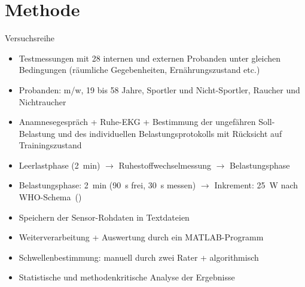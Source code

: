 \documentclass[colorBG,slideColor,8pt]{beamer}
\begin{document}
\section{Methode}

\begin{frame}{Versuchsreihe}
\begin{itemize}
	\item Testmessungen mit 28 internen und externen Probanden unter gleichen Bedingungen (räumliche Gegebenheiten, Ernährungszustand etc.)
	\item Probanden: m/w, 19 bis 58 Jahre, Sportler und Nicht-Sportler, Raucher und Nichtraucher
	\item Anamnesegespräch + Ruhe-EKG + Bestimmung der ungefähren Soll-Belastung und des individuellen Belastungsprotokolls mit Rücksicht auf Trainingszustand
	\item Leerlastphase (\SI{2}{\minute}) $\rightarrow$ Ruhestoffwechselmessung $\rightarrow$ Belastungsphase
	\item Belastungsphase: \SI{2}{\minute} (\SI{90}{\second} frei, \SI{30}{\second} messen) $\rightarrow$ Inkrement: \SI{25}{\watt} nach WHO-Schema~(\cite{Trappe.2000})
	\item Speichern der Sensor-Rohdaten in Textdateien
	\item Weiterverarbeitung + Auswertung durch ein MATLAB-Programm
	\item Schwellenbestimmung: manuell durch zwei Rater + algorithmisch
	\item Statistische und methodenkritische Analyse der Ergebnisse
\end{itemize}
\end{frame}
\end{document}
